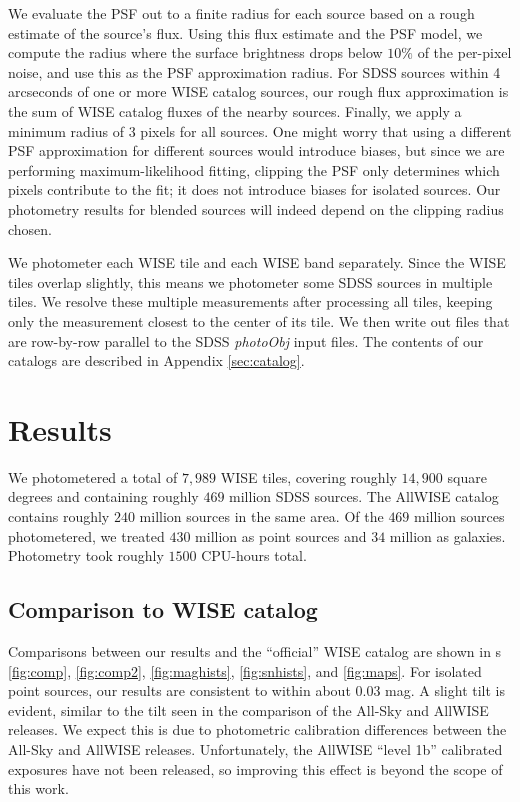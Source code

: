 \documentclass[12pt,preprint]{aastex}
\begin{document}
We evaluate the PSF out to a finite radius for each source based on a
rough estimate of the source's flux.  Using this flux estimate and the
PSF model, we compute the radius where the surface brightness drops
below $10\%$ of the per-pixel noise, and use this as the PSF
approximation radius.  For SDSS sources within 4 arcseconds of one or
more WISE catalog sources, our rough flux approximation is the sum of
WISE catalog fluxes of the nearby sources.  Finally, we apply a
minimum radius of 3 pixels for all sources.  One might worry that
using a different PSF approximation for different sources would
introduce biases, but since we are performing maximum-likelihood
fitting, clipping the PSF only determines which pixels contribute to
the fit; it does not introduce biases for isolated sources.  Our
photometry results for blended sources will indeed depend on the
clipping radius chosen.


We photometer each WISE tile and each WISE band separately.  Since the
WISE tiles overlap slightly, this means we photometer some SDSS
sources in multiple tiles.  We resolve these multiple measurements
after processing all tiles, keeping only the measurement closest to
the center of its tile.  We then write out files that are row-by-row
parallel to the SDSS \emph{photoObj} input files.  The contents of our
catalogs are described in Appendix \ref{sec:catalog}.


\section{Results}

We photometered a total of $7,\!989$ WISE tiles, covering roughly
$14,\!900$ square degrees and containing roughly $469$ million SDSS
sources.  The AllWISE catalog contains roughly $240$ million sources
in the same area.  Of the $469$ million sources photometered, we
treated $430$ million as point sources and $34$ million as galaxies.
Photometry took roughly $1500$ CPU-hours total.


\subsection{Comparison to WISE catalog}

Comparisons between our results and the ``official'' WISE catalog are
shown in \figurename s \ref{fig:comp}, \ref{fig:comp2},
\ref{fig:maghists}, \ref{fig:snhists}, and \ref{fig:maps}.  For isolated point
sources, our results are consistent to within about 0.03 mag.  A
slight tilt is evident, similar to the tilt seen in the comparison of
the All-Sky and AllWISE releases.  We expect this is due to
photometric calibration differences between the All-Sky and AllWISE
releases.  Unfortunately, the AllWISE ``level 1b'' calibrated
exposures have not been released, so improving this effect is beyond
the scope of this work.
\end{document}
